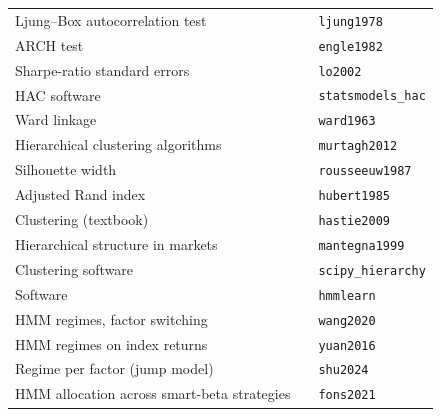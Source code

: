\documentclass[11pt]{article}
\begin{document}
{\begin{longtable}{@{}p{6.3cm}p{5.2cm}p{3.6cm}@{}}
Ljung--Box autocorrelation test & \citet{ljung1978} & \texttt{ljung1978} \\
ARCH test & \citet{engle1982} & \texttt{engle1982} \\
Sharpe-ratio standard errors & \citet{lo2002} & \texttt{lo2002} \\
HAC software & \citet{statsmodels_hac} & \texttt{statsmodels\_hac} \\
Ward linkage & \citet{ward1963} & \texttt{ward1963} \\
Hierarchical clustering algorithms & \citet{murtagh2012} & \texttt{murtagh2012} \\
Silhouette width & \citet{rousseeuw1987} & \texttt{rousseeuw1987} \\
Adjusted Rand index & \citet{hubert1985} & \texttt{hubert1985} \\
Clustering (textbook) & \citet{hastie2009} & \texttt{hastie2009} \\
Hierarchical structure in markets & \citet{mantegna1999} & \texttt{mantegna1999} \\
Clustering software & \citet{scipy_hierarchy} & \texttt{scipy\_hierarchy} \\
Software & \citet{hmmlearn} & \texttt{hmmlearn} \\
HMM regimes, factor switching & \citet{wang2020} & \texttt{wang2020} \\
HMM regimes on index returns & \citet{yuan2016} & \texttt{yuan2016} \\
Regime per factor (jump model) & \citet{shu2024} & \texttt{shu2024} \\
HMM allocation across smart-beta strategies & \citet{fons2021} & \texttt{fons2021} \\
\bottomrule
\end{longtable}}



\end{document}
